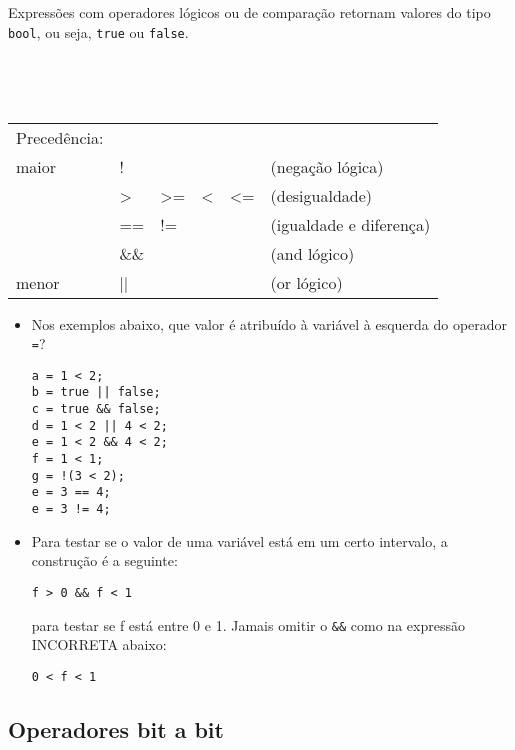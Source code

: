 Expressões com operadores lógicos ou de comparação retornam valores do tipo {\tt bool}, ou seja, {\tt true} ou {\tt false}.

~\\

{\tt
\begin{tabular}{|l|lllll|}
\hline
Precedência:        &      &    &    &    &                                    \\
maior               & !    &    &    &    & (negação lógica)                   \\
                    & >    & >= & <  & <= & (desigualdade)                     \\
                    & ==   & != &    &    & (igualdade e diferença)            \\
                    & \&\& &    &    &    & (and lógico)                       \\
menor               & ||   &    &    &    & (or lógico)                        \\
\hline
\end{tabular}
}

\begin{itemize}

\item Nos exemplos abaixo, que valor é atribuído à variável à esquerda do operador {\tt =}?

\begin{lstlisting}
a = 1 < 2;
b = true || false;
c = true && false;
d = 1 < 2 || 4 < 2;
e = 1 < 2 && 4 < 2;
f = 1 < 1;
g = !(3 < 2);
e = 3 == 4;
e = 3 != 4;
\end{lstlisting}

\item Para testar se o valor de uma variável está em um certo intervalo, a construção é a seguinte: 

\begin{lstlisting}
f > 0 && f < 1
\end{lstlisting}

para testar se f está entre 0 e 1. Jamais omitir o {\tt \&\&} como na expressão INCORRETA abaixo:

\begin{lstlisting}
0 < f < 1
\end{lstlisting}

\end{itemize}

\subsection{Operadores bit a bit}

